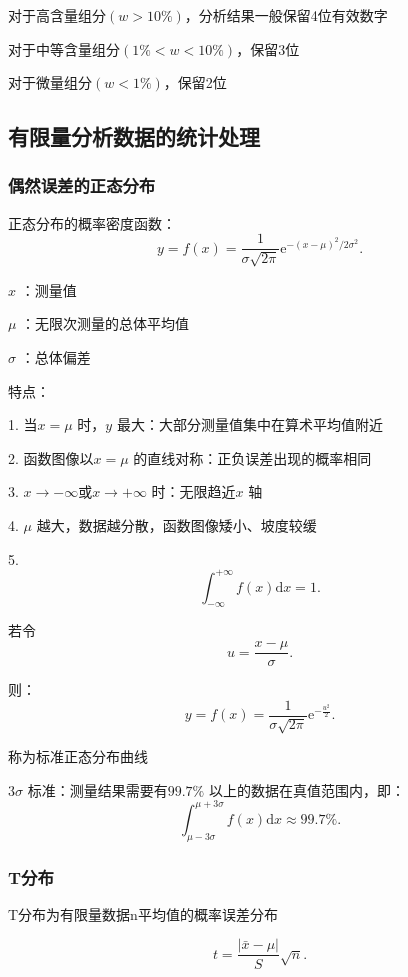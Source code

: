 \begin{notation}
    对于高含量组分$\left( w>10\% \right) $，分析结果一般保留4位有效数字

    对于中等含量组分$\left( 1\%<w<10\% \right) $，保留3位

    对于微量组分$\left( w<1\% \right) $，保留2位
\end{notation}

\subsection{有限量分析数据的统计处理}%
\label{sub:有限量分析数据的统计处理}
\subsubsection{偶然误差的正态分布}%
\label{subsub:偶然误差的正态分布}
正态分布的概率密度函数：\[
    y=f\left( x \right) =\frac{1}{\sigma \sqrt{2\pi} }\text{e}^{-\left( x-\mu \right) ^{2}/2\sigma^{2}}
.\] 
\begin{notation}
    $x$ ：测量值

    $\mu$ ：无限次测量的总体平均值

    $\sigma$ ：总体偏差
\end{notation}
特点：

1. 当$x=\mu$ 时，$y$ 最大：大部分测量值集中在算术平均值附近

2. 函数图像以$x=\mu$ 的直线对称：正负误差出现的概率相同

3. $x\to -\infty$或$x\to +\infty$ 时：无限趋近$x$ 轴

4. $\mu$ 越大，数据越分散，函数图像矮小、坡度较缓

5. 
\[
    \int_{-\infty}^{+\infty} f\left( x \right) \text{d}x=1
.\] 

\begin{notation}
    若令\[
        u=\frac{x-\mu}{\sigma}
    .\] 

    则：\[
        y=f\left( x \right) =\frac{1}{\sigma\sqrt{2\pi}} \text{e}^{-\frac{u^{2}}{2}}
    .\] 
    
    称为标准正态分布曲线
\end{notation}

\begin{notation}
    $3\sigma$ 标准：测量结果需要有$99.7\%$ 以上的数据在真值范围内，即：
    \[
        \int_{\mu-3\sigma}^{\mu+3\sigma}f\left( x \right) \text{d}x\approx 99.7\%
    .\] 
\end{notation}

\subsubsection{T分布}%
\label{subsub:T分布}
\begin{defi}
    T分布为有限量数据n平均值的概率误差分布
\end{defi}
\[
    t=\frac{\left| \bar{x}-\mu \right| }{S}\sqrt{n} 
.\] 

